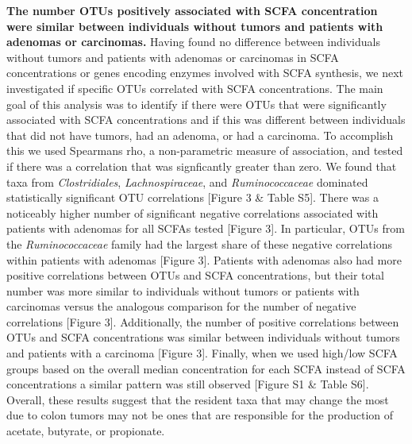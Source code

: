 \documentclass[11pt,]{article}
\begin{document}
\textbf{The number OTUs positively associated with SCFA concentration
were similar between individuals without tumors and patients with
adenomas or carcinomas.} Having found no difference between individuals
without tumors and patients with adenomas or carcinomas in SCFA
concentrations or genes encoding enzymes involved with SCFA synthesis,
we next investigated if specific OTUs correlated with SCFA
concentrations. The main goal of this analysis was to identify if there
were OTUs that were significantly associated with SCFA concentrations
and if this was different between individuals that did not have tumors,
had an adenoma, or had a carcinoma. To accomplish this we used Spearmans
rho, a non-parametric measure of association, and tested if there was a
correlation that was signficantly greater than zero. We found that taxa
from \emph{Clostridiales}, \emph{Lachnospiraceae}, and
\emph{Ruminococcaceae} dominated statistically significant OTU
correlations {[}Figure 3 \& Table S5{]}. There was a noticeably higher
number of significant negative correlations associated with patients
with adenomas for all SCFAs tested {[}Figure 3{]}. In particular, OTUs
from the \emph{Ruminococcaceae} family had the largest share of these
negative correlations within patients with adenomas {[}Figure 3{]}.
Patients with adenomas also had more positive correlations between OTUs
and SCFA concentrations, but their total number was more similar to
individuals without tumors or patients with carcinomas versus the
analogous comparison for the number of negative correlations {[}Figure
3{]}. Additionally, the number of positive correlations between OTUs and
SCFA concentrations was similar between individuals without tumors and
patients with a carcinoma {[}Figure 3{]}. Finally, when we used high/low
SCFA groups based on the overall median concentration for each SCFA
instead of SCFA concentrations a similar pattern was still observed
{[}Figure S1 \& Table S6{]}. Overall, these results suggest that the
resident taxa that may change the most due to colon tumors may not be
ones that are responsible for the production of acetate, butyrate, or
propionate.
\end{document}

